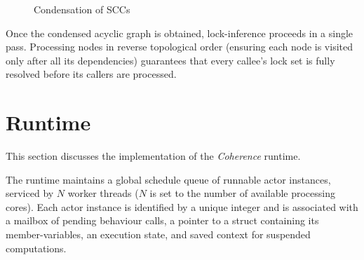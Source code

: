 \begin{figure}[H]
{
    }
    \caption{Condensation of SCCs}
    \label{fig:scc_condensation}
\end{figure}

Once the condensed acyclic graph is obtained, lock-inference proceeds in a single pass. Processing nodes in reverse topological order (ensuring each node is visited only after all its dependencies) guarantees that every callee's lock set is fully resolved before its callers are processed.

\section{Runtime} \label{sec:runtime}
This section discusses the implementation of the \textit{Coherence} runtime.

The runtime maintains a global schedule queue of runnable actor instances, serviced by $N$ worker threads ($N$ is set to the number of available processing cores). Each actor instance is identified by a unique integer and is associated with a mailbox of pending behaviour calls, a pointer to a struct containing its member-variables, an execution state, and saved context for suspended computations.

